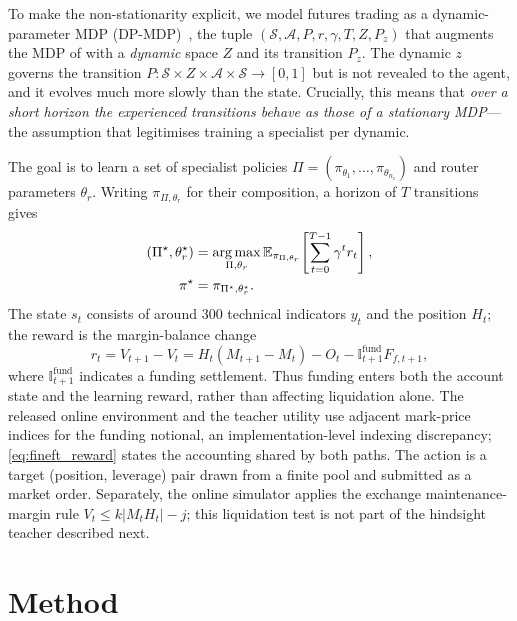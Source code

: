 To make the non-stationarity explicit, we model futures trading as a dynamic-parameter MDP (DP-MDP)~\cite{xie2020deep}, the tuple $(\mathcal{S},\mathcal{A},P,r,\gamma,T,Z,P_z)$ that augments the MDP of  with a \emph{dynamic} space $Z$ and its transition $P_z$. The dynamic $z$ governs the transition $P:\mathcal{S}\times Z\times\mathcal{A}\times\mathcal{S}\to[0,1]$ but is not revealed to the agent, and it evolves much more slowly than the state. Crucially, this means that \emph{over a short horizon the experienced transitions behave as those of a stationary MDP}---the assumption that legitimises training a specialist per dynamic.

The goal is to learn a set of specialist policies $\Pi=(\pi_{\theta_1},\dots,\pi_{\theta_{n_z}})$ and router parameters $\theta_r$. Writing $\pi_{\Pi,\theta_r}$ for their composition, a horizon of $T$ transitions gives
\[
\begin{aligned}
(\Pi^\star,\theta_r^\star)
&=\operatorname*{arg\,max}_{\Pi,\theta_r}
\mathbb{E}_{\pi_{\Pi,\theta_r}}
\!\left[\sum_{t=0}^{T-1}\gamma^t r_t\right],\\[-1pt]
\pi^\star&=\pi_{\Pi^\star,\theta_r^\star}.
\end{aligned}
\]
The state $s_t$ consists of around 300 technical indicators $y_t$ and the position $H_t$; the reward is the margin-balance change
\begin{equation}
\label{eq:fineft_reward}
r_t = V_{t+1}-V_t
    = H_t(M_{t+1}-M_t)-O_t
      -\mathbb{I}^{\mathrm{fund}}_{t+1}F_{f,t+1},
\end{equation}
where $\mathbb{I}^{\mathrm{fund}}_{t+1}$ indicates a funding settlement. Thus funding enters both the account state and the learning reward, rather than affecting liquidation alone. The released online environment and the teacher utility use adjacent mark-price indices for the funding notional, an implementation-level indexing discrepancy; \eqref{eq:fineft_reward} states the accounting shared by both paths. The action is a target (position, leverage) pair drawn from a finite pool and submitted as a market order. Separately, the online simulator applies the exchange maintenance-margin rule $V_t\leq k|M_tH_t|-j$; this liquidation test is not part of the hindsight teacher described next.

\section{Method}
\label{sec:fineft_method}

